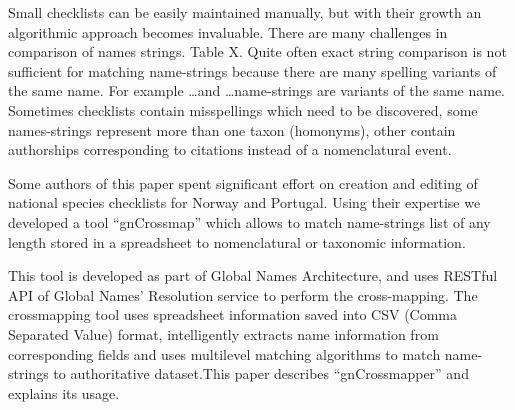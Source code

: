 \documentclass{bmcart}
\begin{document}
  Small checklists can be easily maintained manually, but with their growth an
  algorithmic approach becomes invaluable. There are many challenges in
  comparison of names strings. Table X. Quite often exact string comparison is
  not sufficient for matching name-strings because there are many spelling
  variants of the same name. For example \ldots and \ldots name-strings are
  variants of the same name. Sometimes checklists contain misspellings which
  need to be discovered, some names-strings represent more than one taxon
  (homonyms), other contain authorships corresponding to citations instead of a
  nomenclatural event.

  Some authors of this paper spent significant effort on creation and editing
  of national species checklists for Norway and Portugal. Using their expertise
  we developed a tool ``gnCrossmap'' which allows to match name-strings list of
  any length stored in a spreadsheet to nomenclatural or taxonomic information.

  This tool is developed as part of Global Names Architecture, and uses RESTful
  API of Global Names' Resolution service to perform the cross-mapping. The
  crossmapping tool uses spreadsheet information saved into CSV (Comma
  Separated Value) format, intelligently extracts name information from
  corresponding fields and uses multilevel matching algorithms to match
  name-strings to authoritative dataset.This paper describes ``gnCrossmapper''
  and explains its usage.
\end{document}
